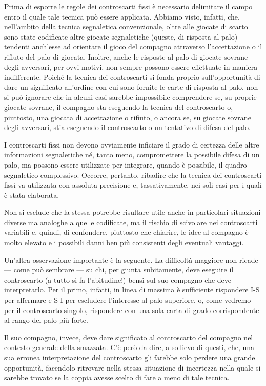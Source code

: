 \documentclass[italian,a4paper]{article}
\begin{document}
Prima di esporre le regole dei controscarti fissi è necessario delimitare il campo entro il quale tale tecnica può essere applicata.
Abbiamo visto, infatti, che, nell'ambito della tecnica segnaletica convenzionale, oltre alle giocate di scarto sono state codificate altre giocate segnaletiche (queste, di risposta al palo) tendenti anch'esse ad orientare il gioco del compagno attraverso l'accettazione o il rifiuto del palo di giocata.
Inoltre, anche le risposte al palo di giocate sovrane degli avversari, per ovvi motivi, non sempre possono essere effettuate in maniera indifferente.
Poiché la tecnica dei controscarti si fonda proprio sull'opportunità di dare un significato all'ordine con cui sono fornite le carte di risposta al palo, non si può ignorare che in alcuni casi sarebbe impossibile comprendere se, su proprie giocate sovrane, il compagno sta eseguendo la tecnica del controscarto o, piuttosto, una giocata di accettazione o rifiuto, o ancora se, su giocate sovrane degli avversari, stia eseguendo il controscarto o un tentativo di difesa del palo.

I controscarti fissi non devono ovviamente inficiare il grado di certezza delle altre informazioni segnaletiche né, tanto meno, compromettere la possibile difesa di un palo, ma possono essere utilizzate per integrare, quando è possibile, il quadro segnaletico complessivo.
Occorre, pertanto, ribadire che la tecnica dei controscarti fissi va utilizzata con assoluta precisione e, tassativamente, nei soli casi per i quali è stata elaborata.

Non si esclude che la stessa potrebbe risultare utile anche in particolari situazioni diverse ma analoghe a quelle codificate, ma il rischio di scivolare nei controscarti variabili e, quindi, di confondere, piuttosto che chiarire, le idee al compagno è molto elevato e i possibili danni ben più consistenti degli eventuali vantaggi.

Un'altra osservazione importante è la seguente. La difficoltà maggiore non
ricade --- come può sembrare --- su chi, per giunta subitamente, deve eseguire  il controscarto (a tutto si fa l'abitudine!)  bensì sul suo compagno che deve interpretarlo.
Per il primo, infatti, in linea di massima è sufficiente rispondere I-S per affermare e  S-I per escludere l'interesse al palo superiore, o, come vedremo per il controscarto singolo, rispondere con una sola carta di grado corrispondente al rango del palo più forte.

 Il suo compagno, invece, deve dare significato al controscarto del compagno nel contesto generale della smazzata. C'è però da dire, a sollievo di questi, che, una sua erronea interpretazione del controscarto gli farebbe solo perdere una grande opportunità, facendolo ritrovare nella stessa situazione di incertezza nella quale si sarebbe trovato se la coppia avesse scelto di fare a meno di tale tecnica.
\end{document}
